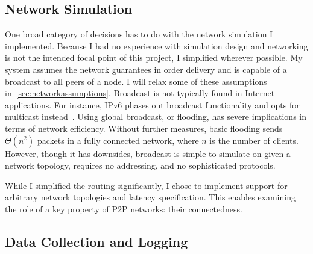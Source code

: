 \documentclass[12pt,a4paper,twoside,openright]{report}
\begin{document}
	\subsection{Network Simulation}
	One broad category of decisions has to do with the network simulation I implemented. Because I had no experience with simulation design and networking is not the intended focal point of this project, I simplified wherever possible. My system assumes the network guarantees in order delivery and is capable of a broadcast to all peers of a node. I will relax some of these assumptions in~\cref{sec:networkassumptions}. Broadcast is not typically found in Internet applications. For instance, IPv6 phases out broadcast functionality and opts for multicast instead~\cite{RFC2460}. Using global broadcast, or flooding, has severe implications in terms of network efficiency. Without further measures, basic flooding sends $\Theta (n^{2})$ packets in a fully connected network, where $n$ is the number of clients. However, though it has downsides, broadcast is simple to simulate on given a network topology, requires no addressing, and no sophisticated protocols.
	
	While I simplified the routing significantly, I chose to implement support for arbitrary network topologies and latency specification. This enables examining the role of a key property of P2P networks: their connectedness.
	
	

	\subsection{Data Collection and Logging} \label{sec:datacollectiondecisions}
	
\end{document}
